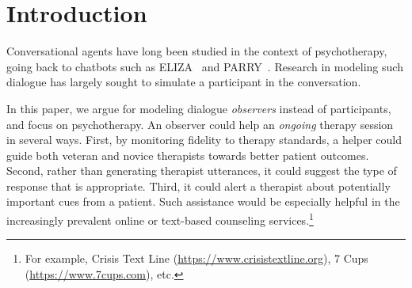 \section{Introduction}
\label{sec:intro}
Conversational agents have long been studied in the context of
psychotherapy, going back to chatbots such as
ELIZA~\cite{weizenbaum1966eliza} and
PARRY~\cite{colby1975artificial}. Research in modeling such dialogue
has largely sought to simulate a participant in the conversation.

In this paper, we argue for modeling dialogue \emph{observers}
instead of participants, and focus on psychotherapy. An observer
could help an \emph{ongoing} therapy session in several ways.
First, by monitoring fidelity to therapy standards, a helper could
guide both veteran and novice therapists towards better patient
outcomes. Second, rather than generating therapist utterances, it
could suggest the type of response that is appropriate. Third, it
could alert a therapist about potentially important cues from a
patient.
%
Such assistance would be especially helpful in the increasingly
prevalent online or text-based counseling services.\footnote{For
  example, Crisis Text Line (\url{https://www.crisistextline.org}),
  7 Cups (\url{https://www.7cups.com}), etc.}

